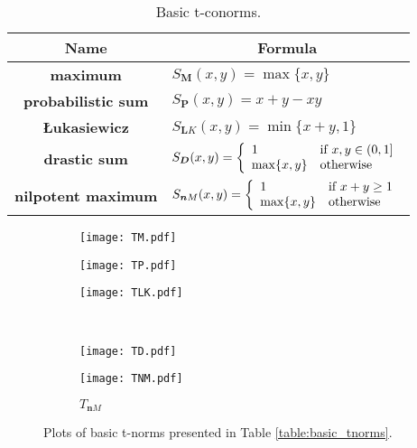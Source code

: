 \begin{table}[ht!]
	\setlength\tabcolsep{5pt}
	\renewcommand{\arraystretch}{1.5}
	\centering
	\begin{tabular}{|c|l|}
		\hline
		\bf Name              & \multicolumn{1}{c|}{\bf Formula}                                                                                           \\ \hline
		\bf maximum           & $S_{\bm M}(x,y)=\max\{x,y\}$                                                                                             \\ \hline
		\bf probabilistic sum & $S_{\bm P}(x,y)=x+y-xy$                                                                                                \\ \hline
		\bf {\L}ukasiewicz       & $S_{\bm LK}(x,y)=\min\{x+y,1\}$                                                                                          \\ \hline
		\bf drastic sum       & $S_{\bm D}(x,y)=\left\{\begin{array}{ll}1 &\hbox{if } x,y \in (0,1]\\\max\{x,y\}&\hbox{otherwise}\end{array}\right.$ \\ \hline
		\bf nilpotent maximum & $S_{\bm nM}(x,y)=\left\{\begin{array}{ll}1 &\hbox{if } x+y \geq 1\\\max\{x,y\}&\hbox{otherwise}\end{array}\right.$   \\ \hline
	\end{tabular}
	\caption{Basic t-conorms.}
	\label{table:basic_toconorms}
\end{table}

\begin{figure}[ht!]
	\centering
	\begin{subfigure}{.3\textwidth}
		\centering
		\texttt{[image: TM.pdf]}
		\caption{\TM}
	\end{subfigure}\hspace{0.5cm}
	\begin{subfigure}{.3\textwidth}
		\centering
		\texttt{[image: TP.pdf]}
		\caption{\TP}
	\end{subfigure}\hspace{0.5cm}
		\begin{subfigure}{.3\textwidth}
		\centering
		\texttt{[image: TLK.pdf]}
		\caption{\TLK}
	\end{subfigure}\\
	\hspace{0.25cm}
	\begin{subfigure}{.4\textwidth}
		\centering
		\texttt{[image: TD.pdf]}
		\caption{\TD}
	\end{subfigure}\hspace{0.25cm}
	\begin{subfigure}{.4\textwidth}
	\centering
	\texttt{[image: TNM.pdf]}
	\caption{$T_{\bm nM}$}
	\end{subfigure}
	\caption{Plots of basic t-norms presented in Table \ref{table:basic_tnorms}.}\label{fig:basic_tnorms}
\end{figure}

